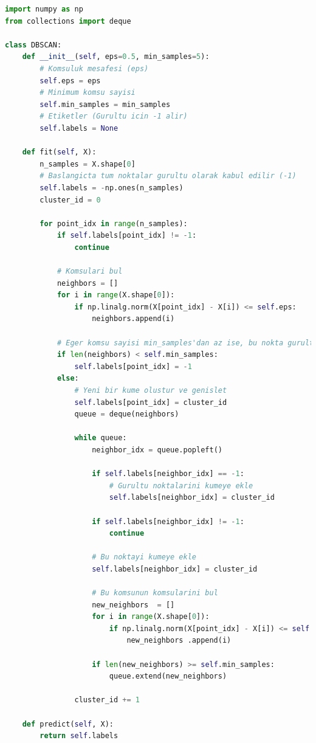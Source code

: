 \begin{lstlisting}[language=Python, caption=Scikit-learn'de DBSCAN.]
import numpy as np
from collections import deque

class DBSCAN:
    def __init__(self, eps=0.5, min_samples=5):
        # Komsuluk mesafesi (eps)
        self.eps = eps
        # Minimum komsu sayisi
        self.min_samples = min_samples
        # Etiketler (Gurultu icin -1 alir)
        self.labels = None

    def fit(self, X):
        n_samples = X.shape[0]
        # Baslangicta tum noktalar gurultu olarak kabul edilir (-1)
        self.labels = -np.ones(n_samples)
        cluster_id = 0

        for point_idx in range(n_samples):
            if self.labels[point_idx] != -1:
                continue

            # Komsulari bul
            neighbors = []
            for i in range(X.shape[0]):
                if np.linalg.norm(X[point_idx] - X[i]) <= self.eps:
                    neighbors.append(i)

            # Eger komsu sayisi min_samples'dan az ise, bu nokta gurultudur
            if len(neighbors) < self.min_samples:
                self.labels[point_idx] = -1
            else:
                # Yeni bir kume olustur ve genislet
                self.labels[point_idx] = cluster_id
                queue = deque(neighbors)
        
                while queue:
                    neighbor_idx = queue.popleft()
        
                    if self.labels[neighbor_idx] == -1:
                        # Gurultu noktalarini kumeye ekle
                        self.labels[neighbor_idx] = cluster_id
        
                    if self.labels[neighbor_idx] != -1:
                        continue
        
                    # Bu noktayi kumeye ekle
                    self.labels[neighbor_idx] = cluster_id
        
                    # Bu komsunun komsularini bul
                    new_neighbors  = []
                    for i in range(X.shape[0]):
                        if np.linalg.norm(X[point_idx] - X[i]) <= self.eps:
                            new_neighbors .append(i)
        
                    if len(new_neighbors) >= self.min_samples:
                        queue.extend(new_neighbors)

                cluster_id += 1

    def predict(self, X):
        return self.labels
\end{lstlisting}

